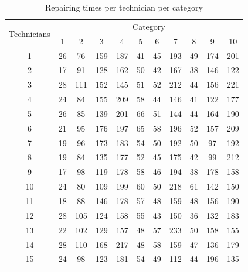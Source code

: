 \begin{table}[H]
	\centering
	\caption{Repairing times per technician per category}
	\begin{tabular}{c|*{10}c}\hline
	\multirow{2}{*}{Technicians} & \multicolumn{10}{|c}{Category} \\ \cline{2-11}
	& 1&2&3&4&5&6&7&8&9&10\\ \hline
	1&26&76&159&187&41&45&193&49&174&201\\
	2&17&91&128&162&50&42&167&38&146&122\\
	3&28&111&152&145&51&52&212&44&156&221\\
	4&24&84&155&209&58&44&146&41&122&177\\
	5&26&85&139&201&66&51&144&44&164&190\\
	6&21&95&176&197&65&58&196&52&157&209\\
	7&19&96&173&183&54&50&192&50&97&192\\
	8&19&84&135&177&52&45&175&42&99&212\\
	9&17&98&119&178&58&46&194&38&178&158\\
	10&24&80&109&199&60&50&218&61&142&150\\
	11&18&88&146&178&57&48&159&48&156&190\\
	12&28&105&124&158&55&43&150&36&132&183\\
	13&22&102&129&157&48&57&233&50&158&155\\
	14&28&110&168&217&48&58&159&47&136&179\\
	15&24&98&123&181&54&49&112&44&196&135\\ \hline
	\end{tabular}
	\label{techcattimes}
\end{table}

